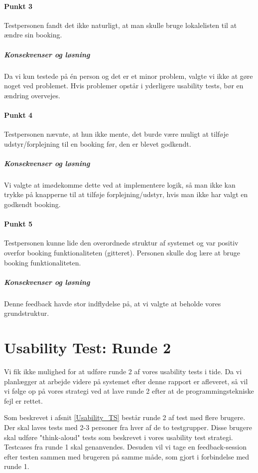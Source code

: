 \paragraph{Punkt 3}
Testpersonen fandt det ikke naturligt, at man skulle bruge lokalelisten til at ændre sin booking.
\subparagraph{Konsekvenser og løsning}
Da vi kun testede på én person og det er et minor problem, valgte vi ikke at gøre noget ved problemet. Hvis problemer opstår i yderligere usability tests, bør en ændring overvejes.

\paragraph{Punkt 4}
Testpersonen nævnte, at hun ikke mente, det burde være muligt at tilføje udstyr/forplejning til en booking før, den er blevet godkendt.
\subparagraph{Konsekvenser og løsning}
Vi valgte at imødekomme dette ved at implementere logik, så man ikke kan trykke på knapperne til at tilføje forplejning/udstyr, hvis man ikke har valgt en godkendt booking.

\paragraph{Punkt 5}
Testpersonen kunne lide den overordnede struktur af systemet og var positiv overfor booking funktionaliteten (gitteret). Personen skulle dog lære at bruge booking funktionaliteten.
\subparagraph{Konsekvenser og løsning}
Denne feedback havde stor indflydelse på, at vi valgte at beholde vores grundstruktur.

\section{Usability Test: Runde 2}
\label{Usability_R2}
Vi fik ikke mulighed for at udføre runde 2 af vores usability tests i tide. Da vi planlægger at arbejde videre på systemet efter denne rapport er afleveret, så vil vi følge op på vores strategi ved at lave runde 2 efter at de programmingstekniske fejl er rettet.

Som beskrevet i afsnit \ref{Usability_TS} består runde 2 af test med flere brugere. Der skal laves tests med 2-3 personer fra hver af de to testgrupper. Disse brugere skal udføre "think-aloud" tests som beskrevet i vores usability test strategi. Testcases fra runde 1 skal genanvendes. Desuden vil vi tage en feedback-session efter testen sammen med brugeren på samme måde, som gjort i forbindelse med runde 1.

